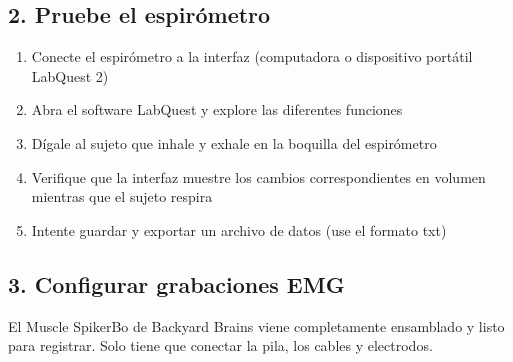 \documentclass[12pt]{article}
\begin{document}
\subsection*{2. Pruebe el espirómetro}

\begin{enumerate}
\item Conecte el espirómetro a la interfaz (computadora o dispositivo
  portátil LabQuest 2)
\item Abra el software LabQuest y explore las diferentes funciones
\item Dígale al sujeto que inhale y exhale en la boquilla del espirómetro
\item Verifique que la interfaz muestre los cambios correspondientes
en volumen mientras que el sujeto respira
\item Intente guardar y exportar un archivo de datos (use el formato txt)
\end{enumerate}

\subsection*{3. Configurar grabaciones EMG}

El Muscle SpikerBo de Backyard Brains viene completamente ensamblado y
listo para registrar. Solo tiene que conectar la pila, los cables y
electrodos.

\vspace{0.2cm}
\end{document}

